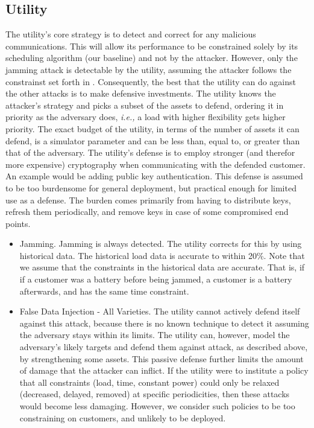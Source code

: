 \documentclass[conference]{IEEEtran}
\newcommand{\ie}{\emph{i.e.,}\xspace}
\begin{document}
\subsection{Utility}
\label{Utility2}

The utility's core strategy is to detect and correct for any malicious communications. This will allow its performance to be
constrained solely by its scheduling algorithm (our baseline) and not by the attacker. However, only the jamming attack is detectable by the utility, assuming the attacker follows the constrainst set forth in \cite{yuan2011modeling}. Consequently, the best that the utility can do against the other attacks is to make defensive investments. The utility knows the attacker's strategy and picks a subset of the assets to defend, ordering it in priority as the adversary does, \ie a load with higher flexibility gets higher priority. The exact budget of the utility, in terms of the number of assets it can defend, is a simulator parameter and can be less than, equal to, or greater than that of the adversary. The utility's defense is to employ stronger (and therefor more expensive) cryptography when communicating with the defended customer.  An example would be adding public key authentication. This defense is assumed to be too burdensome for general deployment, but practical enough for limited use as a defense. The burden comes primarily from having to distribute keys, refresh them periodically, and remove keys in case of some compromised end points.  

\begin{itemize}
\item Jamming. Jamming is always detected. The utility corrects for this by using historical data. The historical load data is accurate to within 20\%.  
Note that we assume that the constraints in the historical data are accurate. That is, if if a customer was a battery before being jammed, a customer is a battery afterwards, and has the same time constraint.

\item False Data Injection - All Varieties. The utility cannot actively defend itself against this attack, because there is no known technique to detect it assuming the adversary stays within its limits. The utility can, however, model the adversary's likely targets and defend them against attack, as described above, by strengthening some assets. This passive defense further limits the amount of damage that the attacker can inflict. If the utility were to institute a policy that all constraints (load, time, constant power) could only be relaxed (decreased, delayed, removed) at specific periodicities, then these attacks would become less damaging. However, we consider such policies to be too constraining on customers, and unlikely to be deployed.

\end{itemize}
\end{document}
